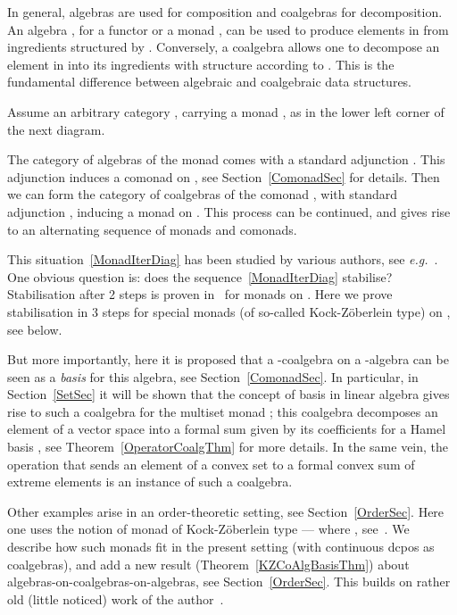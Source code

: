 \documentclass{LMCS}
\begin{document}
In general, algebras are used for composition and coalgebras for
decomposition.  An algebra , for a functor
or a monad , can be used to produce elements in  from
ingredients structured by . Conversely, a coalgebra  allows one to decompose an element in  into its
ingredients with structure according to . This is the fundamental
difference between algebraic and coalgebraic data structures. 

Assume an arbitrary category , carrying a monad , as
in the lower left corner of the next diagram.


\noindent The category  of algebras of the monad  comes
with a standard adjunction . This
adjunction induces a comonad  on , see
Section~\ref{ComonadSec} for details. Then we can form the category
 of coalgebras of the comonad ,
with standard adjunction , inducing a monad  on
. This process can be continued, and gives rise
to an alternating sequence of monads and comonads.

This situation~\eqref{MonadIterDiag} has been studied by various
authors, see
\textit{e.g.}~\cite{Barr69,RoseburghW91,Jacobs94b,Kock95}. One obvious
question is: does the sequence~\eqref{MonadIterDiag} stabilise?
Stabilisation after 2 steps is proven in~\cite{Barr69} for monads on
. Here we prove stabilisation in 3 steps for special monads (of
so-called Kock-Z{\"o}berlein type) on , see below.

But more importantly, here it is proposed that a
-coalgebra on a -algebra can be seen as a
\emph{basis} for this algebra, see Section~\ref{ComonadSec}. In
particular, in Section~\ref{SetSec} it will be shown that the concept
of basis in linear algebra gives rise to such a coalgebra
 for the multiset monad ; this
coalgebra decomposes an element  of a vector space  into a
formal sum  given by its coefficients
 for a Hamel basis , see Theorem~\ref{OperatorCoalgThm}
for more details. In the same vein, the operation that sends an
element of a convex set to a formal convex sum of extreme elements is
an instance of such a coalgebra.

Other examples arise in an order-theoretic setting, see
Section~\ref{OrderSec}.  Here one uses the notion of monad of
Kock-Z{\"o}berlein type --- where ,
see~\cite{Kock95,Escardo98}. We describe how such monads fit in the
present setting (with continuous dcpos as coalgebras), and add a new
result (Theorem~\ref{KZCoAlgBasisThm}) about
algebras-on-coalgebras-on-algebras, see Section~\ref{OrderSec}.  This
builds on rather old (little noticed) work of the
author~\cite{Jacobs94b}.
\end{document}
